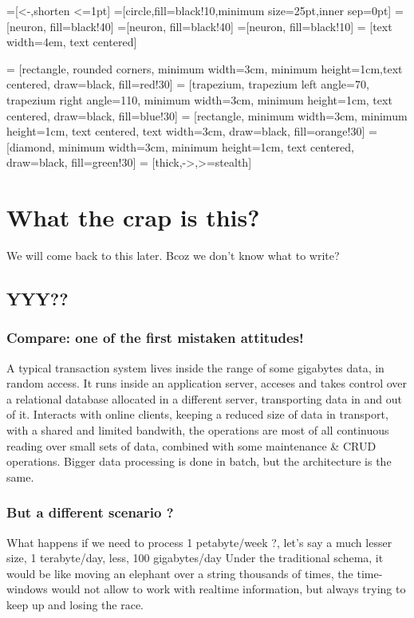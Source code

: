 \documentclass[12pt, right open]{memoir}
\begin{document}
=[<-,shorten <=1pt]
=[circle,fill=black!10,minimum size=25pt,inner sep=0pt]
=[neuron, fill=black!40]
=[neuron, fill=black!40]
=[neuron, fill=black!10]
 = [text width=4em, text centered]

 = [rectangle, rounded corners, minimum width=3cm, minimum height=1cm,text centered, draw=black, fill=red!30]
 = [trapezium, trapezium left angle=70, trapezium right angle=110, minimum width=3cm, minimum height=1cm, text centered, draw=black, fill=blue!30]
 = [rectangle, minimum width=3cm, minimum height=1cm, text centered, text width=3cm, draw=black, fill=orange!30]
 = [diamond, minimum width=3cm, minimum height=1cm, text centered, draw=black, fill=green!30]
 = [thick,->,>=stealth]


\tableofcontents


\chapter{What the crap is this?}
We will come back to this later. Bcoz we don't know what to write? 
\section{YYY??}
\subsection{Compare: one of the first mistaken attitudes!}
A typical transaction system lives inside the range of some gigabytes data, in random access. It runs inside an application server, acceses and takes control over a relational database allocated in a different server, transporting data in and out of it.
Interacts with online clients, keeping a reduced size of data in transport, with a shared and limited bandwith, the operations are most of all continuous reading over small sets of data, combined with some maintenance \& CRUD operations.
Bigger data processing is done in batch, but the architecture is the same.

\subsection{But a different scenario ?}
What happens if we need to process 1 petabyte/week ?, let's say a much lesser size, 1 terabyte/day, less, 100 gigabytes/day
Under the traditional schema, it would be like moving an elephant over a string thousands of times, the time-windows would not allow to work with realtime information, but always trying to keep up and losing the race.
\end{document}
